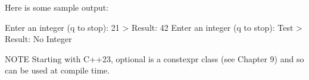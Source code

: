 Here is some sample output:

\begin{shell}
Enter an integer (q to stop): 21
    > Result: 42
Enter an integer (q to stop): Test
    > Result: No Integer
\end{shell}


\begin{myNotic}{NOTE}
Starting with C++23, optional is a constexpr class (see Chapter 9) and so can be used at compile time.
\end{myNotic}

